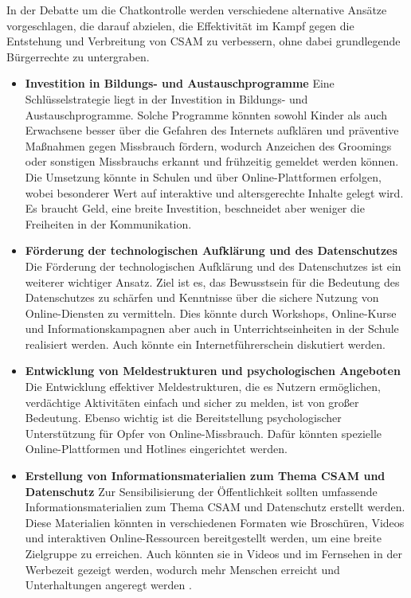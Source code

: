 \documentclass[a4paper]{article}
\begin{document}
In der Debatte um die Chatkontrolle werden verschiedene alternative Ansätze vorgeschlagen, die darauf abzielen, die Effektivität im Kampf gegen die Entstehung und Verbreitung von CSAM zu verbessern, ohne dabei grundlegende Bürgerrechte zu untergraben.
\begin{itemize}
\item \textbf{Investition in Bildungs- und Austauschprogramme}
Eine Schlüsselstrategie liegt in der Investition in Bildungs- und Austauschprogramme. Solche Programme könnten sowohl Kinder als auch Erwachsene besser über die Gefahren des Internets aufklären und präventive Maßnahmen gegen Missbrauch fördern, wodurch Anzeichen des Groomings oder sonstigen Missbrauchs erkannt und frühzeitig gemeldet werden können. Die Umsetzung könnte in Schulen und über Online-Plattformen erfolgen, wobei besonderer Wert auf interaktive und altersgerechte Inhalte gelegt wird. Es braucht Geld, eine breite Investition, beschneidet aber weniger die Freiheiten in der Kommunikation.

\item \textbf{Förderung der technologischen Aufklärung und des Datenschutzes}
Die Förderung der technologischen Aufklärung und des Datenschutzes ist ein weiterer wichtiger Ansatz. Ziel ist es, das Bewusstsein für die Bedeutung des Datenschutzes zu schärfen und Kenntnisse über die sichere Nutzung von Online-Diensten zu vermitteln. Dies könnte durch Workshops, Online-Kurse und Informationskampagnen aber auch in Unterrichtseinheiten in der Schule realisiert werden. Auch könnte ein Internetführerschein diskutiert werden. 

\item \textbf{Entwicklung von Meldestrukturen und psychologischen Angeboten}
Die Entwicklung effektiver Meldestrukturen, die es Nutzern ermöglichen, verdächtige Aktivitäten einfach und sicher zu melden, ist von großer Bedeutung. Ebenso wichtig ist die Bereitstellung psychologischer Unterstützung für Opfer von Online-Missbrauch. Dafür könnten spezielle Online-Plattformen und Hotlines eingerichtet werden.

\item \textbf{Erstellung von Informationsmaterialien zum Thema CSAM und Datenschutz}
Zur Sensibilisierung der Öffentlichkeit sollten umfassende Informationsmaterialien zum Thema CSAM und Datenschutz erstellt werden. Diese Materialien könnten in verschiedenen Formaten wie Broschüren, Videos und interaktiven Online-Ressourcen bereitgestellt werden, um eine breite Zielgruppe zu erreichen. Auch könnten sie in Videos und im Fernsehen in der Werbezeit gezeigt werden, wodurch mehr Menschen erreicht und Unterhaltungen angeregt werden \cite{online_safety_telekom}.


\end{itemize}
\end{document}
